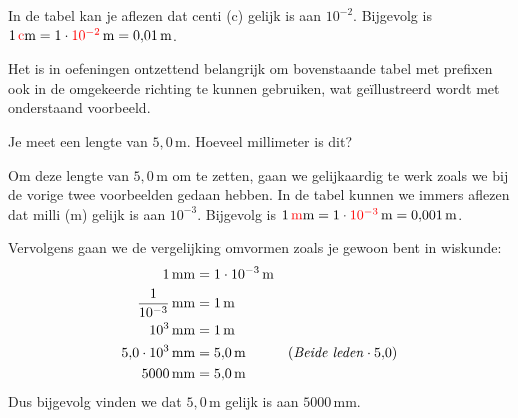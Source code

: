 \documentclass{ximera}
\begin{document}
\begin{example}[title={Rekenen met Prefixen}]\nl
    In de tabel kan je aflezen dat centi (c) gelijk is aan $10^{-2}$. Bijgevolg is $1 \, \textcolor{red}{\mathrm{c}}\mathrm{m} = 1 \cdot \textcolor{red}{10^{-2}} \, \mathrm{m} = 0{,}01 \, \mathrm{m}$.
\end{example}

Het is in oefeningen ontzettend belangrijk om bovenstaande tabel met prefixen ook in de omgekeerde richting te kunnen gebruiken, wat geïllustreerd wordt met onderstaand voorbeeld.

\begin{example}[foldable=true,title={Voorbeeld: Van meter naar millimeter}]\nl
    Je meet een lengte van $5{,}0 \, \mathrm{m}$. Hoeveel millimeter is dit?

    \begin{solution}\nl
    Om deze lengte van $5{,}0 \, \mathrm{m}$ om te zetten, gaan we gelijkaardig te werk zoals we bij de vorige twee voorbeelden gedaan hebben. In de tabel kunnen we immers aflezen dat milli (m) gelijk is aan $10^{-3}$. Bijgevolg is $1 \, \textcolor{red}{\mathrm{m}}\mathrm{m} = 1 \cdot \textcolor{red}{10^{-3}} \, \mathrm{m} = 0{,}001 \, \mathrm{m}$.

    Vervolgens gaan we de vergelijking omvormen zoals je gewoon bent in wiskunde:
    \begin{align*}
    1 \, \mathrm{mm} &= 1 \cdot 10^{-3} \, \mathrm{m} & \\
    \frac{1}{10^{-3}} \, \mathrm{mm} &= 1 \, \mathrm{m} & \\
    10^{3} \, \mathrm{mm} &= 1 \, \mathrm{m} & \\
    5{,}0 \cdot 10^{3} \, \mathrm{mm} &= 5{,}0 \, \mathrm{m} & (\text{\textit{Beide leden}} \cdot 5{,}0) \\
    5000 \, \mathrm{mm} &= 5{,}0 \, \mathrm{m} &
    \end{align*}
    Dus bijgevolg vinden we dat $5{,}0 \, \mathrm{m}$ gelijk is aan $5000 \, \mathrm{mm}$.
    \end{solution}
\end{example}
\end{document}
